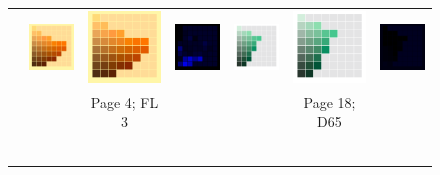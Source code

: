\begin{figure}[t]
{\begin{tabular}{ccccccc}
			\\ \raisebox{0.5cm}[0pt][0pt]{\parbox[c][0pt][c]{0cm}{\hspace{-1.5em}\\[20pt]}\par}
			&
			\includegraphics[width=.155\linewidth]{img/results_uplift_page04_originalFL3.png}
			&
			\includegraphics[width=.155\linewidth]{img/results_uplift_page04_ourFL3.png}
			& 
			\includegraphics[width=.155\linewidth]{img/results_uplift_page04_diff_ourFL3.png}
			&\quad
			\includegraphics[width=.155\linewidth]{img/results_uplift_page18_originalD65.png}
			&
			\includegraphics[width=.155\linewidth]{img/results_uplift_page18_ourD65.png}
			&
			\includegraphics[width=.155\linewidth]{img/results_uplift_page18_diff_ourD65.png}\\
			& & Page 4; FL 3 & & & Page 18; D65 & \\
			\vspace{0.1em} \\ 
			\raisebox{0.4cm}[0pt][0pt]{\parbox[c][0pt][c]{0cm}{\hspace{-1.5em}\\[20pt]}\par}

\end{tabular}}
\end{figure}
